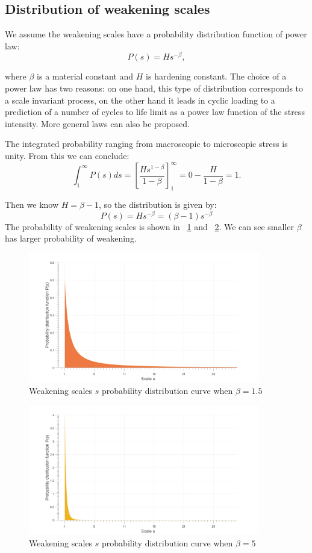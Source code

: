 \documentclass[3p,times,number,review]{elsarticle}
\newcommand{\figref}[1]{\figurename~\ref{#1}}
\begin{document}
\vspace{6pt}

\subsection{Distribution of weakening scales}

We assume the weakening scales have a  probability distribution function of power law:
$$P(s) = Hs^{-\beta},$$

where $\beta$ is a material constant and $H$ is hardening constant. 
The choice of a power law has two reasons: on one hand, this type of distribution corresponds to a scale invariant process, on the other hand it leads in cyclic loading to a prediction of a number of cycles to life limit as a power law function of the stress intensity. More general laws can also be proposed.

The integrated probability ranging from macroscopic to microscopic stress  is unity. From this we can conclude:
$$\int_{1}^{\infty}P(s)ds=\left[ \frac{Hs^{1-\beta}}{1-\beta}\right] _{1}^{\infty}=0-\frac{H}{1-\beta}=1.$$


Then we know $H=\beta-1$, so the distribution is given by:
$$P(s) = Hs^{-\beta}=(\beta-1)s^{-\beta}$$
The probability of weakening scales is shown in \figref{ps1} and \figref{ps2}. We can see smaller $\beta$ has larger probability of weakening.
\begin{figure}[!h]
	\centering
	\includegraphics[width=0.9\textwidth]{figures//ps1.png} 
	\caption{Weakening scales $s$ probability distribution curve when $\beta=1.5$ }
	\label{ps1}
\end{figure}
\begin{figure}[!h]
	\centering
	\includegraphics[width=0.9\textwidth]{figures//ps2.png} 
	\caption{Weakening scales $s$ probability distribution curve when $\beta=5$ }
	\label{ps2}
\end{figure}
\end{document}
